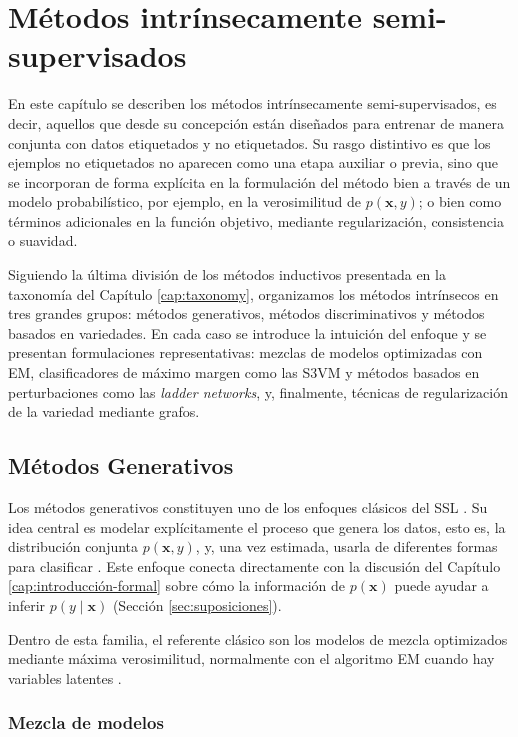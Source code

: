 \chapter{Métodos intrínsecamente semi-supervisados}

En este capítulo se describen los métodos intrínsecamente semi-supervisados, es decir, aquellos que desde su concepción están diseñados para entrenar de manera conjunta con datos etiquetados y no etiquetados. Su rasgo distintivo es que los ejemplos no etiquetados no aparecen como una etapa auxiliar o previa, sino que se incorporan de forma explícita en la formulación del método bien a través de un modelo probabilístico, por ejemplo, en la verosimilitud de $p(\mathbf{x},y)$; o bien como términos adicionales en la función objetivo, mediante regularización, consistencia o suavidad.

Siguiendo la última división de los métodos inductivos presentada en la taxonomía del Capítulo \ref{cap:taxonomy}, organizamos los métodos intrínsecos en tres grandes grupos: métodos generativos, métodos discriminativos y métodos basados en variedades. En cada caso se introduce la intuición del enfoque y se presentan formulaciones representativas: mezclas de modelos optimizadas con EM, clasificadores de máximo margen como las S3VM y métodos basados en perturbaciones como las \textit{ladder networks}, y, finalmente, técnicas de regularización de la variedad mediante grafos.

\section{Métodos Generativos}

Los métodos generativos constituyen uno de los enfoques clásicos del \gls{SSL} \cite{zhu2005semi}. Su idea central es modelar explícitamente el proceso que genera los datos, esto es, la distribución conjunta $p(\mathbf{x},y)$, y, una vez estimada, usarla de diferentes formas para clasificar \cite{van2020survey}. Este enfoque conecta directamente con la discusión del Capítulo \ref{cap:introducción-formal} sobre cómo la información de $p(\mathbf{x})$ puede ayudar a inferir $p(y\mid\mathbf{x})$ (Sección \ref{sec:suposiciones}).

Dentro de esta familia, el referente clásico son los modelos de mezcla optimizados mediante máxima verosimilitud, normalmente con el algoritmo \gls{EM} cuando hay variables latentes \cite{dempster1977maximum}.

\subsection{Mezcla de modelos}

